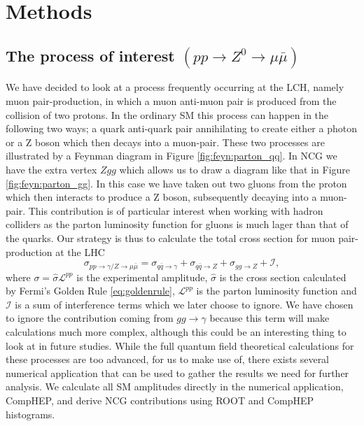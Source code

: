 \section{Methods}

\subsection{The process of interest $(pp \rightarrow Z^0 \rightarrow \mu \bar\mu)$}
We have decided to look at a process frequently occurring at the LCH, namely muon pair-production, in which a muon anti-muon pair is produced from the collision of two protons. In the ordinary SM this process can happen in the following two ways; a quark anti-quark pair annihilating to create either a photon or a Z boson which then decays into a muon-pair. These two processes are illustrated by a Feynman diagram in Figure \ref{fig:feyn:parton_qq}. In NCG we have the extra vertex $Zgg$ which allows us to draw a diagram like that in Figure \ref{fig:feyn:parton_gg}. In this case we have taken out two gluons from the proton which then interacts to produce a Z boson, subsequently decaying into a muon-pair. This contribution is of particular interest when working with hadron colliders as the parton luminosity function for gluons is much lager than that of the quarks. Our strategy is thus to calculate the total cross section for muon pair-production at the LHC
\begin{equation}
	\sigma_{pp \rightarrow \gamma/ Z \rightarrow \mu \bar \mu} = \sigma_{q \bar q \rightarrow \gamma} + \sigma_{q \bar q \rightarrow Z} + \sigma_{gg \rightarrow Z} + \mathcal{I},
\end{equation}
where $\sigma =\hat \sigma \mathcal{L}^{pp}$ is the experimental amplitude, $\hat \sigma$ is the cross section calculated by Fermi's Golden Rule \eqref{eq:goldenrule}, $\mathcal{L}^{pp}$ is the parton luminosity function and $\mathcal{I}$ is a sum of interference terms which we later choose to ignore. We have chosen to ignore the contribution coming from $gg \rightarrow \gamma$ because this term will make calculations much more complex, although this could be an interesting thing to look at in future studies. While the full quantum field theoretical calculations for these processes are too advanced, for us to make use of, there exists several numerical application that can be used to gather the results we need for further analysis. We calculate all SM amplitudes directly in the numerical application, CompHEP, and derive NCG contributions using ROOT and CompHEP histograms.

